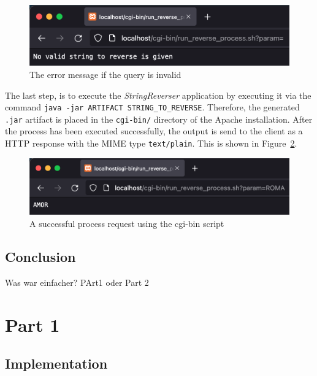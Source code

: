 \documentclass{article}
\def\Fig#1{Figure~\ref{#1}}
\begin{document}
\begin{figure}[h]
\centering
\includegraphics[scale=0.6]{images/part2Failure2}
\caption{The error message if the query is invalid}
\label{fig:01_part2_impl_failure2}
\end{figure}

The last step, is to execute the \textit{StringReverser} application by executing it via the command \texttt{java -jar ARTIFACT STRING\_TO\_REVERSE}. Therefore, the generated \texttt{.jar} artifact is placed in the \texttt{cgi-bin/} directory of the Apache installation. After the process has been executed successfully, the output is send to the client as a HTTP response with the MIME type \texttt{text/plain}. This is shown in \Fig{fig:01_part2_impl_success}.

\begin{figure}[h]
\centering
\includegraphics[scale=0.6]{images/part2Success}
\caption{A successful process request using the cgi-bin script}
\label{fig:01_part2_impl_success}
\end{figure}

\subsection{Conclusion}\label{subsec:02_part2_concl}
Was war einfacher? PArt1 oder Part 2






\pagebreak
\appendix
{}

\section{Part 1}

\subsection{Implementation}
\end{document}
